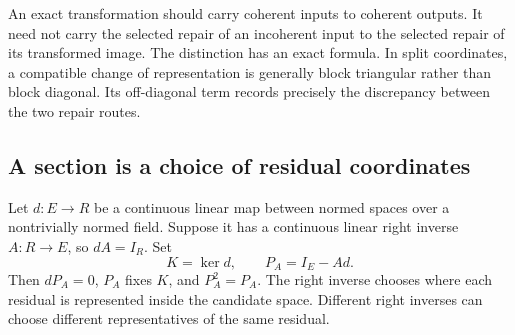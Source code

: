 \label{sec:repair-transport}
An exact transformation should carry coherent inputs to coherent outputs. It need not carry the selected repair of an incoherent input to the selected repair of its transformed image. The distinction has an exact formula. In split coordinates, a compatible change of representation is generally block triangular rather than block diagonal. Its off-diagonal term records precisely the discrepancy between the two repair routes.

\subsection{A section is a choice of residual coordinates}
Let \(d:E\to R\) be a continuous linear map between normed spaces over a nontrivially normed field. Suppose it has a continuous linear right inverse \(A:R\to E\), so \(dA=I_R\). Set
\[
 K=\ker d,\qquad P_A=I_E-Ad.
\]
Then \(dP_A=0\), \(P_A\) fixes \(K\), and \(P_A^2=P_A\). The right inverse chooses where each residual is represented inside the candidate space. Different right inverses can choose different representatives of the same residual.

